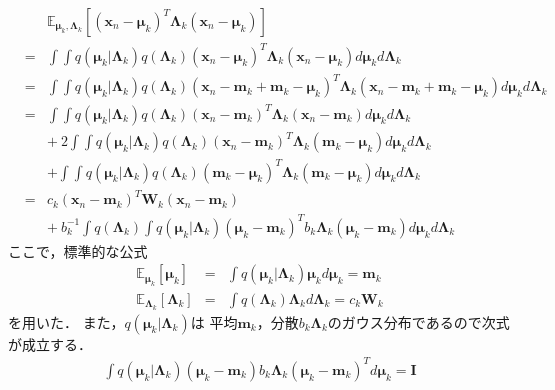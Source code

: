 \begin{eqnarray}
&& \mathbb{E}_{\bm\mu_{k},\bm\Lambda_{k}}
  \left[
  \left(\bm{x}_n - \bm\mu_{k}\right)^T
  \bm\Lambda_{k}
  \left(\bm{x}_n - \bm\mu_{k}\right)\right]
\nonumber \\
&=&
\int\!\!\!\int
q(\bm\mu_{k}|\bm\Lambda_{k})q(\bm\Lambda_{k})
\left(\bm{x}_n - \bm\mu_{k}\right)^T
  \bm\Lambda_{k}
  \left(\bm{x}_n - \bm\mu_{k}\right)
d\bm\mu_{k} d\bm\Lambda_{k}
\nonumber \\
&=&
\int\!\!\!\int
q(\bm\mu_{k}|\bm\Lambda_{k})q(\bm\Lambda_{k})
\left(\bm{x}_n - \bm{m}_{k} + \bm{m}_{k} - \bm\mu_{k}\right)^T
  \bm\Lambda_{k}
  \left(\bm{x}_n - \bm{m}_{k} + \bm{m}_{k} - \bm\mu_{k}\right)
d\bm\mu_{k} d\bm\Lambda_{k}
\nonumber \\
&=&
\int\!\!\!\int
q(\bm\mu_{k}|\bm\Lambda_{k})q(\bm\Lambda_{k})
\left(\bm{x}_n - \bm{m}_{k}\right)^T
  \bm\Lambda_{k}
  \left(\bm{x}_n - \bm{m}_{k}\right)
d\bm\mu_{k} d\bm\Lambda_{k}
\nonumber \\
&&
+
\ 2 \int\!\!\!\int
q(\bm\mu_{k}|\bm\Lambda_{k})q(\bm\Lambda_{k})
\left(\bm{x}_n - \bm{m}_{k}\right)^T
  \bm\Lambda_{k}
  \left(\bm{m}_{k} - \bm\mu_{k}\right)
d\bm\mu_{k} d\bm\Lambda_{k}
\nonumber \\
&&
+
\int\!\!\!\int
q(\bm\mu_{k}|\bm\Lambda_{k})q(\bm\Lambda_{k})
\left(\bm{m}_{k} - \bm\mu_{k}\right)^T
  \bm\Lambda_{k}
  \left(\bm{m}_{k} - \bm\mu_{k}\right)
d\bm\mu_{k} d\bm\Lambda_{k}
\nonumber \\
&=&
c_{k} \left(\bm{x}_n - \bm{m}_{k}\right)^T
\bm{W}_{k}
\left(\bm{x}_n - \bm{m}_{k}\right)
\nonumber \\
&&
+ \ b_{k}^{-1}
\int q(\bm\Lambda_{k})
\int q(\bm\mu_{k}|\bm\Lambda_{k})
\left(\bm\mu_{k} - \bm{m}_{k}\right)^T
  b_{k} \bm\Lambda_{k}
  \left(\bm\mu_{k} - \bm{m}_{k}\right)
d\bm\mu_{k} d\bm\Lambda_{k}
\end{eqnarray}
ここで，標準的な公式
\begin{eqnarray}
\mathbb{E}_{\bm\mu_{k}}[\bm\mu_{k}]
&=&
\int q(\bm\mu_{k}|\bm\Lambda_{k}) \bm\mu_{k} d\bm\mu_{k} 
= \bm{m}_{k}
\\
\mathbb{E}_{\bm\Lambda_{k}}[\bm\Lambda_{k}]
&=&
\int q(\bm\Lambda_{k}) \bm\Lambda_{k} d\bm\Lambda_{k} 
= c_{k} \bm{W}_{k}
\end{eqnarray}
を用いた．
また，$q(\bm\mu_{k}|\bm\Lambda_{k})$は
平均$\bm{m}_{k}$，分散$b_{k}\bm\Lambda_{k}$のガウス分布であるので次式が成立する．
\begin{eqnarray}
 \int q(\bm\mu_{k}|\bm\Lambda_{k})
\left(\bm\mu_{k} - \bm{m}_{k}\right)
  b_{k} \bm\Lambda_{k}
  \left(\bm\mu_{k} - \bm{m}_{k}\right)^T
d\bm\mu_{k}
= \bm{I}
\end{eqnarray}
